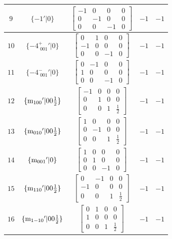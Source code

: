 \documentclass[fleqn,8pt]{jsarticle}
\begin{document}
\begin{longtable}{ccccc}
$ 9 $ & $ \{-1{}'|0\} $ & $ \begin{bmatrix} -1 & 0 & 0 & 0 \\ 0 & -1 & 0 & 0 \\ 0 & 0 & -1 & 0 \end{bmatrix} $ & $ -1 $ & $ -1 $ \\ \hline
$ 10 $ & $ \{-4^{+}_{\,\,001}{}'|0\} $ & $ \begin{bmatrix} 0 & 1 & 0 & 0 \\ -1 & 0 & 0 & 0 \\ 0 & 0 & -1 & 0 \end{bmatrix} $ & $ -1 $ & $ -1 $ \\ \hline
$ 11 $ & $ \{-4^{-}_{\,\,001}{}'|0\} $ & $ \begin{bmatrix} 0 & -1 & 0 & 0 \\ 1 & 0 & 0 & 0 \\ 0 & 0 & -1 & 0 \end{bmatrix} $ & $ -1 $ & $ -1 $ \\ \hline
$ 12 $ & $ \{{\rm m}_{100}{}'|0 0 \frac{1}{2}\} $ & $ \begin{bmatrix} -1 & 0 & 0 & 0 \\ 0 & 1 & 0 & 0 \\ 0 & 0 & 1 & \frac{1}{2} \end{bmatrix} $ & $ -1 $ & $ -1 $ \\ \hline
$ 13 $ & $ \{{\rm m}_{010}{}'|0 0 \frac{1}{2}\} $ & $ \begin{bmatrix} 1 & 0 & 0 & 0 \\ 0 & -1 & 0 & 0 \\ 0 & 0 & 1 & \frac{1}{2} \end{bmatrix} $ & $ -1 $ & $ -1 $ \\ \hline
$ 14 $ & $ \{{\rm m}_{001}{}'|0\} $ & $ \begin{bmatrix} 1 & 0 & 0 & 0 \\ 0 & 1 & 0 & 0 \\ 0 & 0 & -1 & 0 \end{bmatrix} $ & $ -1 $ & $ -1 $ \\ \hline
$ 15 $ & $ \{{\rm m}_{110}{}'|0 0 \frac{1}{2}\} $ & $ \begin{bmatrix} 0 & -1 & 0 & 0 \\ -1 & 0 & 0 & 0 \\ 0 & 0 & 1 & \frac{1}{2} \end{bmatrix} $ & $ -1 $ & $ -1 $ \\ \hline
$ 16 $ & $ \{{\rm m}_{1-10}{}'|0 0 \frac{1}{2}\} $ & $ \begin{bmatrix} 0 & 1 & 0 & 0 \\ 1 & 0 & 0 & 0 \\ 0 & 0 & 1 & \frac{1}{2} \end{bmatrix} $ & $ -1 $ & $ -1 $ \\ \hline

\end{longtable}
\end{document}
